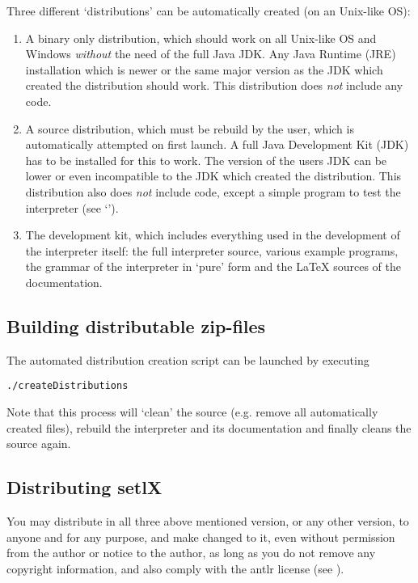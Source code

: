 Three different `distributions' can be automatically created (on an Unix-like OS):

\begin{enumerate}
	\item A binary only distribution, which should work on all Unix-like OS and Windows \emph{without} the need of the full Java JDK. Any Java Runtime (JRE) installation which is newer or the same major version as the JDK which created the distribution should work. This distribution does \emph{not} include any \SetlX{} code.

	\item A source distribution, which must be rebuild by the user, which is automatically attempted on first launch. A full Java Development Kit (JDK) has to be installed for this to work. The version of the users JDK can be lower or even incompatible to the JDK which created the distribution. This distribution also does \emph{not} include \SetlX{} code, except a simple program to test the interpreter (see `').

	\item The development kit, which includes everything used in the development of the interpreter itself: the full interpreter source, various \SetlX{} example programs, the grammar of the interpreter in `pure' form and the \LaTeX{} sources of the documentation.
\end{enumerate}

\subsection{Building distributable zip-files}

The automated distribution creation script can be launched by executing

\begin{lstlisting}[frame=none,numbers=none]
./createDistributions
\end{lstlisting}

Note that this process will `clean' the source (e.g. remove all automatically created files), rebuild the interpreter and its documentation and finally cleans the source again.

\subsection{Distributing setlX}

You may distribute \setlX{} in all three above mentioned version, or any other version, to anyone and for any purpose, and make changed to it, even without permission from the author or notice to the author, as long as you do not remove any copyright information, and also comply with the antlr license (see ).

